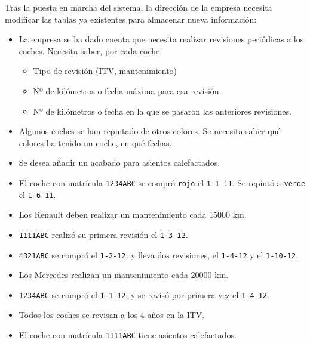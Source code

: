 \begin{homeworkProblem}

  Tras la puesta en marcha del sistema, la dirección de la empresa necesita modificar las tablas ya existentes para almacenar nueva información:
  
  \begin{itemize}
  \item La empresa se ha dado cuenta que necesita realizar revisiones
    periódicas a los coches. Necesita saber, por cada coche:
    \begin{itemize}
    \item Tipo de revisión (ITV, mantenimiento)
    \item Nº de kilómetros o fecha máxima para esa revisión.
    \item Nº de kilómetros o fecha en la que se pasaron las anteriores revisiones.
    \end{itemize}


  \item  Algunos coches se han repintado de otros colores. Se necesita saber qué colores ha tenido un coche, en qué fechas.
  \item  Se desea añadir un acabado para asientos calefactados.
  \end{itemize}
\end{homeworkProblem}

\begin{homeworkProblem}

  \begin{itemize}
  \item El coche con matrícula \texttt{1234ABC} se compró \texttt{rojo} el \texttt{1-1-11}. Se repintó a \texttt{verde} el \texttt{1-6-11}.
  \item  Los Renault deben realizar un mantenimiento cada 15000 km.
    
  \item \texttt{1111ABC} realizó su primera revisión el \texttt{1-3-12}.
  \item \texttt{4321ABC} se compró el \texttt{1-2-12}, y lleva dos revisiones, el \texttt{1-4-12} y el \texttt{1-10-12}.

  \item Los Mercedes realizan un mantenimiento cada 20000 km. 
  \item \texttt{1234ABC}   se compró el \texttt{1-1-12}, y se revisó por primera vez el \texttt{1-4-12}.
  \item Todos los coches se revisan a los 4 años en la ITV.
  \item El coche con matrícula \texttt{1111ABC} tiene asientos calefactados.
  \end{itemize}
\end{homeworkProblem}

